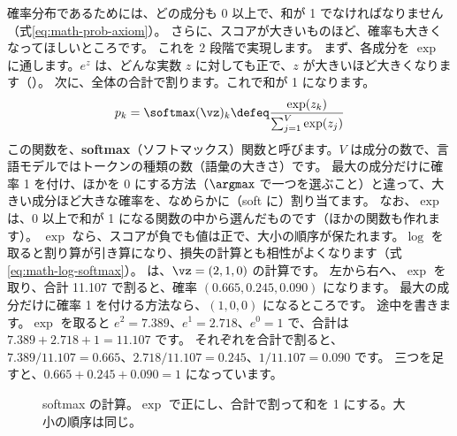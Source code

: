 確率分布であるためには、どの成分も 0 以上で、和が 1 でなければなりません（式\eqref{eq:math-prob-axiom}）。
さらに、スコアが大きいものほど、確率も大きくなってほしいところです。
これを 2 段階で実現します。
まず、各成分を $\exp$ に通します。$e^{z}$ は、どんな実数 $z$ に対しても正で、$z$ が大きいほど大きくなります（）。
次に、全体の合計で割ります。これで和が 1 になります。
\begin{equation}
p_k=\softmax(\vz)_k\defeq\frac{\exp(z_k)}{\sum_{j=1}^{V}\exp(z_j)}
\label{eq:math-softmax}
\end{equation}
この関数を、\textbf{softmax}（ソフトマックス）関数と呼びます。$V$ は成分の数で、言語モデルではトークンの種類の数（語彙の大きさ）です。
最大の成分だけに確率 1 を付け、ほかを 0 にする方法（$\argmax$ で一つを選ぶこと）と違って、大きい成分ほど大きな確率を、なめらかに（soft に）割り当てます。
なお、$\exp$ は、0 以上で和が 1 になる関数の中から選んだものです（ほかの関数も作れます）。
$\exp$ なら、スコアが負でも値は正で、大小の順序が保たれます。$\log$ を取ると割り算が引き算になり、損失の計算とも相性がよくなります（式\eqref{eq:math-log-softmax}）。
は、$\vz=(2,1,0)$ の計算です。
左から右へ、$\exp$ を取り、合計 11.107 で割ると、確率 $(0.665,0.245,0.090)$ になります。
最大の成分だけに確率 1 を付ける方法なら、$(1,0,0)$ になるところです。
途中を書きます。$\exp$ を取ると $e^{2}=7.389$、$e^{1}=2.718$、$e^{0}=1$ で、合計は $7.389+2.718+1=11.107$ です。
それぞれを合計で割ると、$7.389/11.107=0.665$、$2.718/11.107=0.245$、$1/11.107=0.090$ です。
三つを足すと、$0.665+0.245+0.090=1$ になっています。

\begin{figure}[tbp]
\centering
{}
\caption{softmax の計算。$\exp$ で正にし、合計で割って和を 1 にする。大小の順序は同じ。}
\label{fig:math-softmax}
\end{figure}

